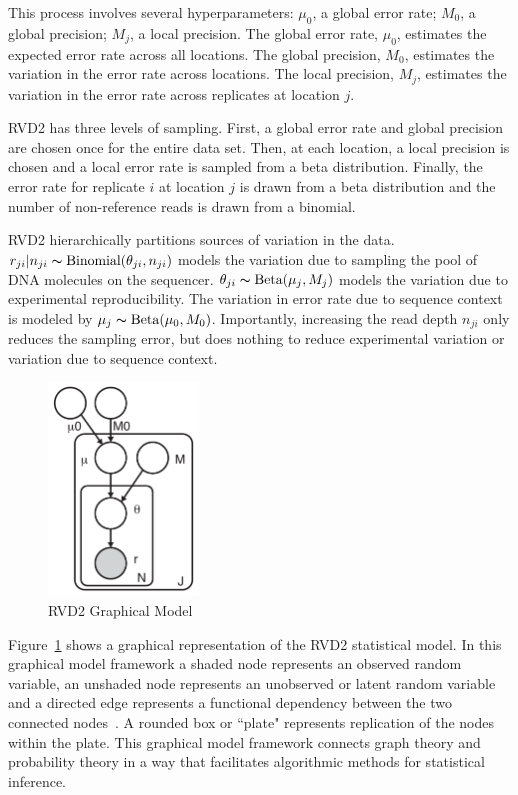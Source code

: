 \documentclass[11pt,reqno]{amsart}
\begin{document}
This process involves several hyperparameters: $\mu_0$, a global error rate; $M_0$, a global precision; $M_j$, a local precision. The global error rate, $\mu_0$, estimates the expected error rate across all locations. The global precision, $M_0$, estimates the variation in the error rate  across locations. The local precision, $M_j$, estimates the variation in the error rate across replicates at location $j$.

RVD2 has three levels of sampling. First, a global error rate and global precision are chosen once for the entire data set. Then, at each location, a local precision is chosen and a local error rate is sampled from a beta distribution. Finally, the error rate for replicate $i$ at location $j$ is drawn from a beta distribution and the number of non-reference reads is drawn from a binomial.

RVD2 hierarchically partitions sources of variation in the data. $r_{ji} | n_{ji} \thicksim \text{Binomial}(\theta_{ji}, n_{ji})$ models the variation due to sampling the pool of DNA molecules on the sequencer. $\theta_{ji} \thicksim \text{Beta}(\mu_j, M_j)$ models the variation due to experimental reproducibility. The variation in error rate due to sequence context is modeled by $\mu_j \thicksim \text{Beta}(\mu_0, M_0)$. Importantly, increasing the read depth $n_{ji}$ only reduces the sampling error, but does nothing to reduce experimental variation or variation due to sequence context.

\begin{figure}[h]
\begin{center}
\includegraphics[width=40mm]{pdf_figs/RVD2_model.pdf}
\caption{RVD2 Graphical Model}
\label{fig:graphical_model}
\end{center}
\end{figure}

Figure~\ref{fig:graphical_model} shows a graphical representation of the RVD2 statistical model. In this graphical model framework a shaded node represents an observed random variable, an unshaded node represents an unobserved or latent random variable and a directed edge represents a functional dependency between the two connected nodes~\cite{}. A rounded box or ``plate" represents replication of the nodes within the plate. This graphical model framework connects graph theory and probability theory in a way that facilitates algorithmic methods for statistical inference.
\end{document}
